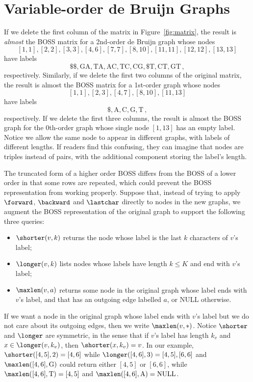 \chapter{Variable-order de Bruijn Graphs}


If we delete the first column of the matrix in Figure~\ref{fig:matrix}, the result is {\em almost} the BOSS matrix for a 2nd-order de Bruijn graph whose nodes
\[[1, 1], [2, 2], [3, 3], [4, 6], [7, 7], [8, 10], [11, 11], [12, 12], [13, 13]\]
have labels
\[\mathrm{\$\$, GA, TA, AC, TC, CG, \$T, CT, GT}\,,\]
respectively.  Similarly, if we delete the first two columns of the original matrix, the result is almost the BOSS matrix for a 1st-order graph whose nodes
\[[1, 1], [2, 3], [4, 7], [8, 10], [11, 13]\]
have labels
\[\mathrm{\$, A, C, G, T}\,,\]
respectively.  If we delete the first three columns, the result is almost the BOSS graph for the 0th-order graph whose single node \([1, 13]\) has an empty label.  Notice we allow the same node to appear in different graphs, with labels of different lengths.  If readers find this confusing, they can imagine that nodes are triples instead of pairs, with the additional component storing the label's length.

The truncated form of a higher order BOSS differs from the BOSS of a lower order in that
some rows are repeated, which could prevent the BOSS representation from working properly.  Suppose that, instead of trying to apply $\forward$, $\backward$ and $\lastchar$ directly to nodes in the new graphs, we augment the BOSS representation of the original graph to support the following three queries:
\begin{itemize}
\item $\shorter(v, k)$ returns the node whose label is the last $k$ characters of $v$'s label;
\item $\longer(v, k)$ lists nodes whose labels have length \(k \leq K\) and end with $v$'s label;
\item $\maxlen(v, a)$ returns some node in the original graph whose label ends with $v$'s label, and that has an outgoing edge labelled $a$, or NULL otherwise. %
\end{itemize}
If we want a node in the original graph whose label ends with $v$'s label but we do not care about its outgoing edges, then we write \(\maxlen(v, *)\).  Notice $\shorter$ and $\longer$ are symmetric, in the sense that if $v$'s label has length $k_v$ and \(x \in \longer(v, k_v)\), then \(\shorter(x, k_v) = v\).  In our example, \(\shorter([4, 5], 2) = [4, 6]\) while \(\longer([4, 6], 3) = [4, 5], [6, 6]\) and \(\maxlen ([4, 6], \mathrm{G})\) could return either \([4, 5]\) or \([6, 6]\), while \(\maxlen([4, 6], \mathrm{T}) = [4, 5]\) and \(\maxlen([4, 6], \mathrm{A}) = \mathrm{NULL}\).



